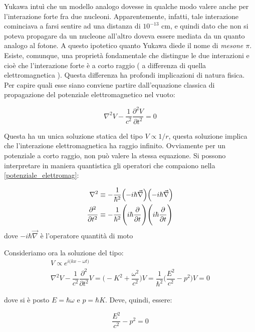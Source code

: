 Yukawa intuì che un modello analogo dovesse in qualche modo valere anche per
l'interazione forte fra due nucleoni. Apparentemente, infatti, tale interazione
cominciava a farsi sentire ad una distanza di $10^{-13}$ cm, e quindi dato che
non si poteva propagare da un nucleone all'altro doveva essere mediata da un
quanto analogo al fotone. A questo ipotetico quanto Yukawa diede il nome
di \textit{mesone $\pi$}. Esiste, comunque, una
proprietà fondamentale che distingue le due interazioni e cioè che l'interazione
forte è a corto raggio ( a differenza di quella elettromagnetica ). Questa
differenza ha profondi implicazioni di natura fisica. Per capire quali esse
siano conviene partire dall'equazione classica di propagazione del potenziale
elettromagnetico nel vuoto:

\begin{equation}
\label{potenziale_elettromag}
\nabla^2 V - \dfrac{1}{c^2} \dfrac{\partial^2 V}{\partial t^2} = 0
\end{equation}

Questa ha un unica soluzione statica del tipo $V \propto 1/ r$, questa soluzione
implica che l'interazione elettromagnetica ha raggio infinito. Ovviamente per un
potenziale a corto raggio, non può valere la stessa equazione. Si possono
interpretare in maniera quantistica gli operatori che compaiono nella
\ref{potenziale_elettromag}:

\begin{align*}
\nabla^2 &\equiv - \dfrac{1}{\hbar^2} \Bigl(-i \hbar \vec{\nabla} \Bigr) \Bigl( -i \hbar \vec{\nabla} \Bigr) \\
\dfrac{\partial^2}{\partial t^2} &\equiv - \dfrac{1}{\hbar^2} \Biggl( i \hbar \dfrac{\partial}{\partial t} \Biggr) \Biggl( i \hbar \dfrac{\partial}{\partial t} \Biggr) 
\end{align*}
dove $-i \hbar \vec{\nabla}$ è l'operatore quantità di moto 

Consideriamo ora la soluzione del tipo:
\begin{gather*}
V \propto e^{i \bigl(kx - \omega t \bigr)} \\
\nabla^2 V - \dfrac{1}{c^2} \dfrac{\partial^2}{\partial t^2} V = \Biggl (-K^2 + \dfrac{\omega^2}{c^2} \Biggr) V = \dfrac{1}{\hbar^2} \Biggl(\dfrac{E^2}{c^2} - p^2 \Biggr) V = 0
\end{gather*}

dove si è posto $E=\hbar \omega$ e $p=\hbar K$. Deve, quindi, essere: 

\begin{equation*}
\dfrac{E^2}{c^2} - p^2 = 0
\end{equation*}

